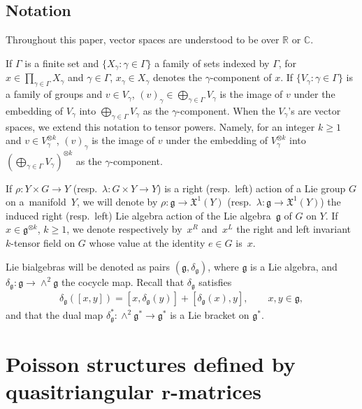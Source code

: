 \documentclass[10pt,a4paper]{amsart}
\numberwithin{equation}{section}
\newcommand{\IC}{\mathbb{C}}
\newcommand{\IR}{\mathbb{R}}
\newcommand{\XX}{\mathfrak{X}}
\def \g {\mathfrak{a}}
\def \g {\mathfrak{g}}
\begin{document}
\subsection{Notation} \label{nota}

Throughout this paper, vector spaces are understood to be over $\IR$ or $\IC$.

If $\Gamma$ is a f\/inite set and $\{X_\gamma \colon \gamma \in \Gamma\}$ a family of sets indexed by $\Gamma$, for $x \in \prod_{\gamma \in \Gamma} X_\gamma$ and $\gamma \in \Gamma$, $x_\gamma \in X_\gamma$ denotes the $\gamma$-component of $x$. If $\{V_\gamma\colon \gamma \in \Gamma\}$ is a family of groups and $v \in V_\gamma$, $(v)_\gamma \in \bigoplus_{\gamma \in \Gamma}V_\gamma$ is the image of $v$ under the embedding of $V_\gamma$ into $\bigoplus_{\gamma \in \Gamma}V_\gamma$ as the $\gamma$-component. When the $V_\gamma$'s are vector spaces, we extend this notation to tensor powers. Namely, for an integer $k \geq 1$ and $v \in V_\gamma^{\otimes k}$, $(v)_\gamma$ is the image of $v$ under the embedding of $V_\gamma^{\otimes k}$ into $(\bigoplus_{\gamma \in \Gamma}V_\gamma)^{\otimes k}$ as the $\gamma$-component.

If $\rho\colon Y \times G \to Y$ (resp.\ $\lambda\colon G \times Y \to Y$) is a right (resp.\ left) action of a Lie group $G$ on a~mani\-fold~$Y$, we will denote by $\rho\colon \g \to \XX^1(Y)$ (resp.\ $\lambda\colon \g \to \XX^1(Y)$) the induced right (resp.\ left) Lie algebra action of the Lie algebra~$\g$ of $G$ on $Y$. If $x \in \g^{\otimes k}$, $k \geq 1$, we denote respectively by~$x^R$ and~$x^L$ the right and left invariant $k$-tensor f\/ield on $G$ whose value at the identity $e \in G$ is~$x$.

Lie bialgebras will be denoted as pairs $(\g, \delta_\g)$, where $\g$ is a Lie algebra, and $\delta_\g\colon \g \to \wedge^2 \g$ the cocycle map. Recall that $\delta_\g$ satisf\/ies
\begin{gather*}
\delta_\g([x,y]) = [x, \delta_\g(y)] + [\delta_\g(x), y], \qquad x,y \in \g,
\end{gather*}
and that the dual map $\delta_\g^*\colon {\wedge}^2 \g^* \to \g^*$ is a Lie bracket on $\g^*$.

\section[Poisson structures def\/ined by quasitriangular $r$-matrices]{Poisson structures def\/ined by quasitriangular $\boldsymbol{r}$-matrices} \label{sec-quasitri}
\end{document}
